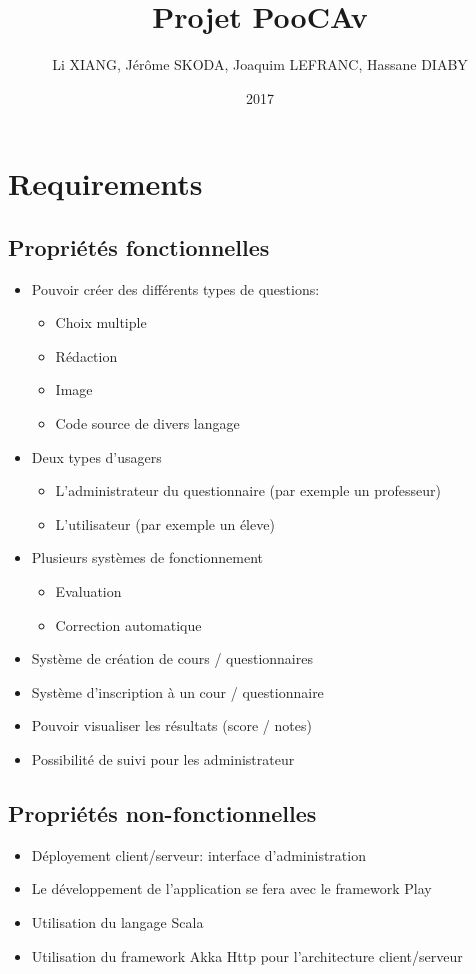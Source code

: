 \documentclass[12pt]{article}
\title{Projet PooCAv}
\author{Li XIANG, Jérôme SKODA, Joaquim LEFRANC, Hassane DIABY}
\date{2017}
\begin{document}
\maketitle
\section{Requirements}

\subsection{Propriétés fonctionnelles}
\begin{itemize}
  \item Pouvoir créer des différents types de questions:
    \begin{itemize}
      \item Choix multiple
      \item Rédaction
      \item Image
      \item Code source de divers langage
    \end{itemize}
  \item Deux types d'usagers
    \begin{itemize}
      \item L'administrateur du questionnaire (par exemple un professeur)
      \item L'utilisateur (par exemple un éleve)
    \end{itemize}
  \item Plusieurs systèmes de fonctionnement
    \begin{itemize}
      \item Evaluation
      \item Correction automatique
    \end{itemize}
	\item Système de création de cours / questionnaires
	\item Système d'inscription à un cour / questionnaire
  \item Pouvoir visualiser les résultats (score / notes)
  \item Possibilité de suivi pour les administrateur
\end{itemize}

\subsection{Propriétés non-fonctionnelles}
\begin{itemize}
  \item Déployement client/serveur: interface d'administration
	\item Le développement de l'application se fera avec le framework Play
	\item Utilisation du langage Scala
	\item Utilisation du framework Akka Http pour l'architecture client/serveur
\end{itemize}
\end{document}
